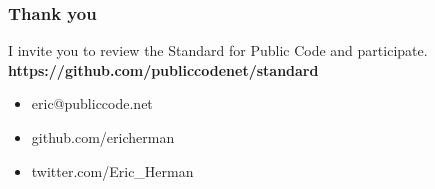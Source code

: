 \documentclass{beamer}
\begin{document}
\begin{frame}
\frametitle{Thank you}
I invite you to review the Standard for Public Code and participate.\newline\newline
\textbf{https://github.com/publiccodenet/standard}\newline\newline

\begin{itemize}
\item eric@publiccode.net
\item github.com/ericherman
\item twitter.com/Eric\_Herman
\end{itemize}
\end{frame}
\end{document}
